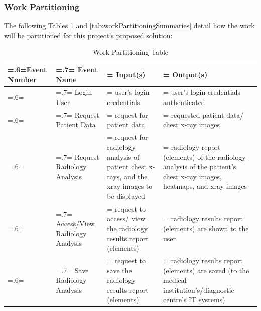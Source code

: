 \documentclass[12pt]{article}
\begin{document}
\subsubsection{Work Partitioning}
The following Tables \ref{tab:workPartitioningEvents} and \ref{tab:workPartitioningSummaries} detail how the work will be partitioned for this project's proposed solution:
\begin{table}[H]
    \centering
    \caption{Work Partitioning Table}
    \label{tab:workPartitioningEvents}
    \begin{tabularx}{\textwidth}{|
    >{\hsize=.6\hsize\linewidth=\hsize}X|>{\hsize=.7\hsize\linewidth=\hsize}X|
    >{\hsize=1.3\hsize\linewidth=\hsize}X|>{\hsize=1.4\hsize\linewidth=\hsize}X|}
        \hline
        \textbf{Event Number} & \textbf{Event Name} & \textbf{Input(s)} & \textbf{Output(s)} \\
        \hline
        1 & Login User & user's login credentials & user's login credentials authenticated \\
        \hline
        2 & Request Patient Data & request for patient data & requested patient data/ chest x-ray images \\
        \hline
        3 & Request Radiology Analysis & request for radiology analysis of patient chest x-rays, and the xray images to be displayed & radiology report (elements) of the radiology analysis of the patient's chest x-ray images, heatmaps, and xray images \\
        \hline
        4 & Access/View Radiology Analysis & request to access/ view the radiology results report (elements) & radiology results report (elements) are shown to the user \\
        \hline
        5 & Save Radiology Analysis & request to save the radiology results report (elements) & radiology results report (elements) are saved (to the medical institution's/diagnostic centre's IT systems) \\
        \hline
    \end{tabularx}
\end{table}
\end{document}
